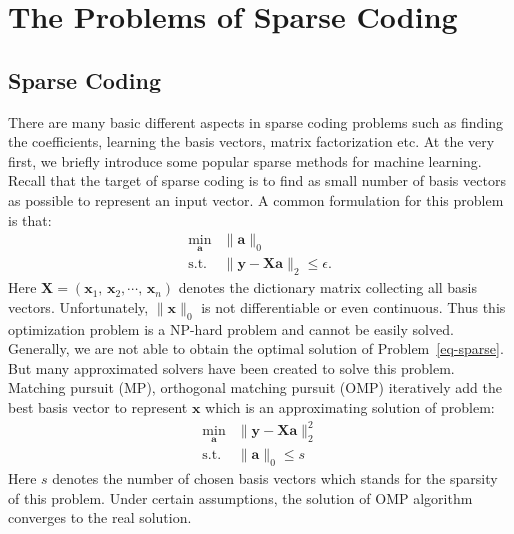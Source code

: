 \section{The Problems of Sparse Coding}
\label{sec:problem of SR}
\subsection{Sparse Coding}
\label{subsec:sparse coding}


There are many basic different aspects in sparse coding problems such as finding the coefficients, learning the basis vectors, matrix factorization etc.
At the very first, we briefly introduce some popular sparse methods for machine learning.
Recall that the target of sparse coding is to find as small number of basis vectors as possible to represent an input vector.
A common formulation for this problem is that:
\begin{equation}
\begin{array}{cl}
\min_{\mathbf{a}} & \|\mathbf{a}\|_0\\
\mathrm{s.t.} & \|\mathbf{y}-\mathbf{X}\mathbf{a}\|_2 \leq \epsilon.
\end{array}
\label{eq-sparse}
\end{equation}
Here $\mathbf{X}=(\mathbf{x}_1,\,\mathbf{x}_2,\cdots ,\,\mathbf{x}_n)$ denotes the dictionary matrix collecting all basis vectors.
Unfortunately, $\|\mathbf{x}\|_0$ is not differentiable or even continuous.
Thus this optimization problem is a NP-hard problem and cannot be easily solved.
Generally, we are not able to obtain the optimal solution of Problem~\ref{eq-sparse}.
But many approximated solvers have been created to solve this problem.
Matching pursuit (MP), orthogonal matching pursuit (OMP) iteratively add the best basis vector to represent $\mathbf{x}$ which is an approximating solution of problem:
\begin{equation}
\begin{array}{cl}
\min_{\mathbf{a}} & \|\mathbf{y}-\mathbf{X}\mathbf{a}\|_2^2 \\
\mathrm{s.t.} & \|\mathbf{a}\|_0 \leq s
\end{array}
\end{equation}
Here $s$ denotes the number of chosen basis vectors which stands for the sparsity of this problem.
Under certain assumptions, the solution of OMP algorithm converges to the real solution.

